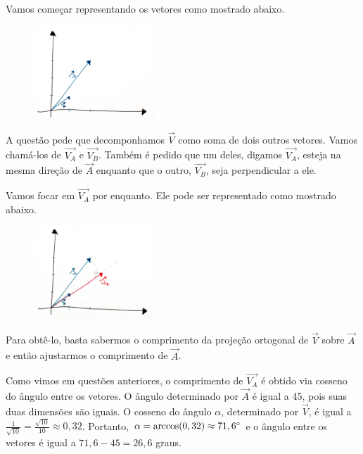 \documentclass[main.tex]{subfiles}
\begin{document}
Vamos começar representando os vetores como mostrado abaixo.

\begin{figure}[h]
\centering
\includegraphics[width=0.4\textwidth]{./img/c4r1.jpg}
\end{figure}

A questão pede que decomponhamos $\overrightarrow{V}$ como soma de dois outros vetores. Vamos chamá-los de $\overrightarrow{V_A}$ e $\overrightarrow{V_B}$. Também é pedido que um deles, digamos $\overrightarrow{V_A}$, esteja na mesma direção de $\overrightarrow{A}$ enquanto que o outro, $\overrightarrow{V_B}$, seja perpendicular a ele.

Vamos focar em $\overrightarrow{V_A}$ por enquanto. Ele pode ser representado como mostrado abaixo.

\begin{figure}[h]
\centering
\includegraphics[width=0.4\textwidth]{./img/c4r2.jpg}
\end{figure}

Para obtê-lo, basta sabermos o comprimento da projeção ortogonal de $\overrightarrow{V}$ sobre $\overrightarrow{A}$ e então ajustarmos o comprimento de $\overrightarrow{A}$.

Como vimos em questões anteriores, o comprimento de $\overrightarrow{V_A}$ é obtido via cosseno do ângulo entre os vetores. O ângulo determinado por $\overrightarrow{A}$ é igual a 45\degree, pois suas duas dimensões são iguais. O cosseno do ângulo $\alpha$, determinado por $\overrightarrow{V}$, é igual a $\frac{1}{\sqrt{10}}=\frac{\sqrt{10}}{10} \approx 0,32$. Portanto, $\alpha = \arccos(0,32) \approx 71,6\degree$ e o ângulo entre os vetores é igual a $71,6-45=26,6$ graus.
\end{document}
